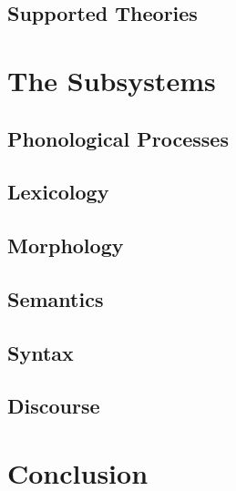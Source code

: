 \documentclass{beamer}
\begin{document}
\subsection{Supported Theories}

\section{The Subsystems}
\subsection{Phonological Processes}
\subsection{Lexicology}
\subsection{Morphology}
\subsection{Semantics}
\subsection{Syntax}
\subsection{Discourse}

\section{Conclusion}
\end{document}
